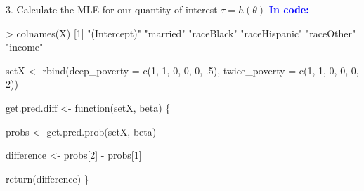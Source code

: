 \documentclass[handout]{beamer}
\newcommand{\blue}[1]{\textcolor{blue}{#1}}
\newcommand{\bblue}[1]{\textbf{\textcolor{blue}{#1}}}
\begin{document}

\begin{frame}[fragile]{3. Calculate the MLE for our quantity of interest $\tau = h(\theta)$}
\bblue{In code:}
\begin{footnotesize}
\begin{semiverbatim}
> colnames(X)
[1] "(Intercept)"  "married"      "raceBlack"    
     "raceHispanic" "raceOther"    "income"
\end{semiverbatim} \pause
\begin{semiverbatim}
setX <- rbind(deep_poverty = c(1, 1, 0, 0, 0, .5),
              twice_poverty = c(1, 1, 0, 0, 0, 2))
\end{semiverbatim} \pause
\begin{semiverbatim}
get.pred.diff <- function(setX, beta) \{
\end{semiverbatim} \pause
\begin{semiverbatim}
  probs <- get.pred.prob(setX, beta)
\end{semiverbatim} \pause
\begin{semiverbatim}
  difference <- probs[2] - probs[1]
\end{semiverbatim} \pause
\begin{semiverbatim}
  return(difference)
\}
\end{semiverbatim}
\end{footnotesize}
\end{frame}
\end{document}
